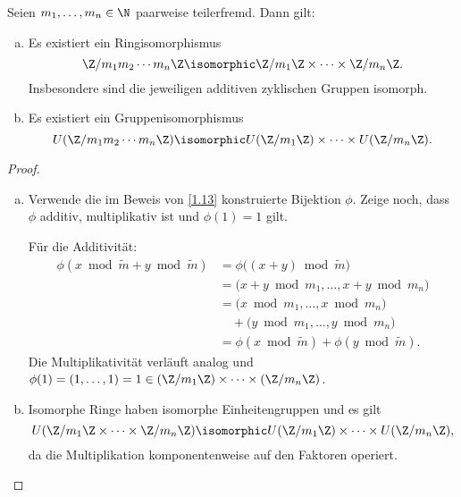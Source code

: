\begin{st} \label{1.14}
	Seien $m_1, \dotsc, m_n \in \N$ paarweise teilerfremd.
	Dann gilt:
	\begin{enumerate}[a)]
		\item
			Es existiert ein Ringisomorphismus
			\[
				\Z / m_1m_2 \dotsb m_n \Z
				\isomorphic
				\Z /m_1 \Z \times \dotsb \times \Z / m_n \Z.
			\]
			Insbesondere sind die jeweiligen additiven zyklischen Gruppen isomorph.
		\item
			Es existiert ein Gruppenisomorphismus
			\[
				U(\Z / m_1 m_2 \dotsb m_n \Z)
				\isomorphic
				U(\Z / m_1 \Z) \times \dotsb \times U(\Z / m_n \Z).
			\]
	\end{enumerate}
	\begin{proof}
		\begin{enumerate}[a)]
			\item
				Verwende die im Beweis von \ref{1.13} konstruierte Bijektion $\phi$.
				Zeige noch, dass $\phi$ additiv, multiplikativ ist und $\phi(1) = 1$ gilt.

				Für die Additivität:
				\begin{align*}
					\phi(x \bmod \tilde m + y \bmod \tilde m)
					&= \phi\big( (x+y) \bmod \tilde m \big) \\
					&= \big(x + y \bmod m_1, \dotsc, x + y \bmod m_n \big) \\
					&= \big( x \bmod m_1, \dotsc, x \bmod m_n\big) \\
					&\quad + \big(y \bmod m_1, \dotsc, y \bmod m_n \big) \\
					&= \phi(x \bmod \tilde m) + \phi(y \bmod \tilde m).
				\end{align*}
				Die Multiplikativität verläuft analog und $\phi(1) = (1, \dotsc, 1) = 1 \in (\Z / m_1 \Z) \times \dotsb \times (\Z / m_n \Z)$.
			\item
				Isomorphe Ringe haben isomorphe Einheitengruppen und es gilt
				\[
					U(\Z / m_1 \Z \times \dotsb \times \Z / m_n \Z)
					\isomorphic U(\Z / m_1 \Z) \times \dotsb \times U(\Z / m_n \Z),
				\]
				da die Multiplikation komponentenweise auf den Faktoren operiert.
		\end{enumerate}
	\end{proof}
\end{st}

